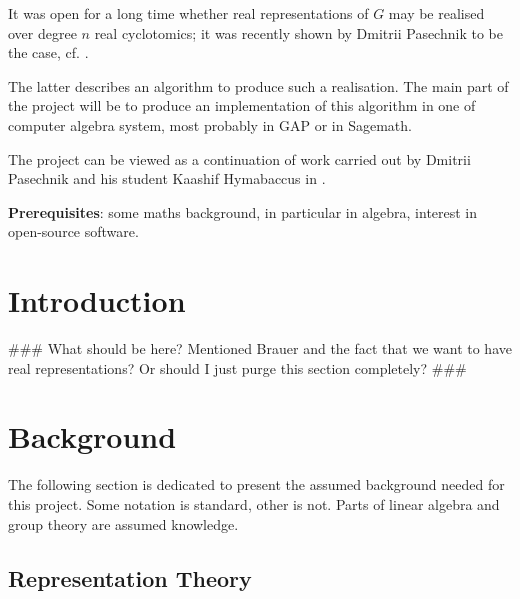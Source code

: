 \documentclass[11pt]{article}
\begin{document}
It was open for a long time whether real representations of $G$ may be realised
over degree $n$ real cyclotomics; it was recently shown by Dmitrii Pasechnik to be
the case, cf. \cite{Pas21}.

The latter describes an algorithm to produce such a realisation. The main part of the
project will be to produce an implementation of this algorithm in one of computer
algebra system, most probably in GAP or in Sagemath.

The project can be viewed as a continuation of work carried out by Dmitrii Pasechnik
and his student Kaashif Hymabaccus in \cite{Hymabaccus2020}.

\textbf{Prerequisites}: some maths background, in particular in algebra, interest in open-source software.

\newpage

\tableofcontents

\newpage

\section{Introduction}

\#\#\# What should be here? Mentioned Brauer and the fact that we want to have real representations?
Or should I just purge this section completely? \#\#\#

\newpage

\section{Background}

The following section is dedicated to present the assumed background needed for this project.
Some notation is standard, other is not. Parts of linear algebra and group theory are assumed knowledge.

\subsection{Representation Theory}
\end{document}
